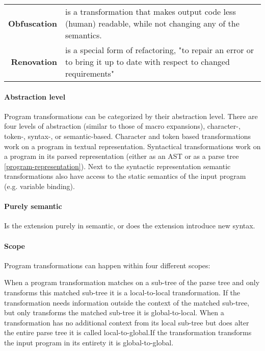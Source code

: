 \begin{table}[h]
\begin{adjustbox}{width=1\textwidth}
\begin{tabular}{rl}
{\bf Obfuscation}                 & is a transformation that makes output code less (human) readable, while not changing any of the semantics.                                                                    \\
{\bf Renovation}                  & is a special form of refactoring, "to repair an error or to bring it up to date with respect to changed requirements"\cite{Visser2001}                                                
\end{tabular}
\end{adjustbox}
\end{table}

\paragraph{Abstraction level}
Program transformations can be categorized by their abstraction level. There are four levels of abstraction (similar to those of macro expansions\cite{Weise1993}), character-, token-, syntax-, or semantic-based. Character and token based transformations work on a program in textual representation. Syntactical transformations work on a program in its parsed representation (either as an AST or as a parse tree \ref{program-representation}). Next to the syntactic representation semantic transformations also have access to the static semantics of the input program (e.g. variable binding).

\paragraph{Purely semantic}
Is the extension purely in semantic, or does the extension introduce new syntax.

\paragraph{Scope}
Program transformations can happen within four different scopes: 

When a program transformation matches on a sub-tree of the parse tree and only transforms this matched sub-tree it is a local-to-local transformation. If the transformation needs information outside the context of the matched sub-tree, but only transforms the matched sub-tree it is global-to-local. When a transformation has no additional context from its local sub-tree but does alter the entire parse tree it is called local-to-global.If the transformation transforms the input program in its entirety it is global-to-global.  

